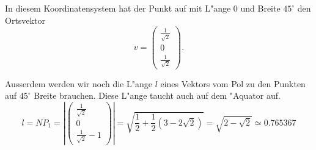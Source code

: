 \begin{loesung}
In diesem Koordinatensystem hat der Punkt auf mit L"ange 0
und Breite $45^\circ$ den Ortsvektor
\[
v=
\begin{pmatrix}
\frac1{\sqrt{2}}\\0\\\frac1{\sqrt{2}}
\end{pmatrix}.
\]

Ausserdem werden wir noch die L"ange $l$ eines Vektors vom Pol zu den Punkten
auf $45^\circ$ Breite brauchen. Diese L"ange taucht auch auf dem "Aquator
auf. 
\[
l
=
\overline{NP_1}
=
\left|
\begin{pmatrix}
\frac1{\sqrt{2}}\\0\\\frac1{\sqrt{2}}-1
\end{pmatrix}
\right|
=
\sqrt{\frac12 +\frac12(3-2\sqrt{2})}=\sqrt{2-\sqrt{2}}
\simeq
0.765367
\]


\end{loesung}
